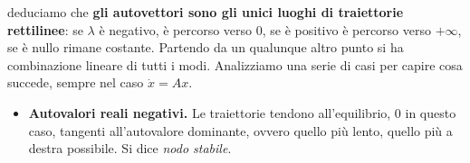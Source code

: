 deduciamo che \textbf{gli autovettori sono gli unici luoghi di traiettorie rettilinee}: se $\lambda $ è negativo, è percorso verso $0$, se è positivo è percorso verso $+\infty $, se è nullo rimane costante. Partendo da un qualunque altro punto si ha combinazione lineare di tutti i modi. Analizziamo una serie di casi per capire cosa succede, sempre nel caso $\dot{x} =Ax$.
\begin{itemize}
	\item \textbf{Autovalori reali negativi.} Le traiettorie tendono all'equilibrio, $0$ in questo caso, tangenti all'autovalore dominante, ovvero quello più lento, quello più a destra possibile. Si dice \textit{nodo stabile}.
	      
	      \begin{figure}[htpb]\centering
	      	
	      	\begin{tikzpicture}[x=0.75pt,y=0.75pt,yscale=-1,xscale=1]
	      		

\end{tikzpicture}
\end{figure}
\end{itemize}
